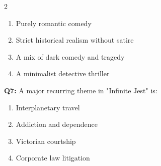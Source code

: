 \documentclass[10pt]{article}
\begin{document}
\begin{multicols}{2}
\begin{enumerate}[label=\arabic*.]
\item Purely romantic comedy
\item Strict historical realism without satire
\item A mix of dark comedy and tragedy
\item A minimalist detective thriller
\end{enumerate}
\textbf{Q7:} A major recurring theme in "Infinite Jest" is:

\begin{enumerate}[label=\arabic*.]
\item Interplanetary travel
\item Addiction and dependence
\item Victorian courtship
\item Corporate law litigation
\end{enumerate}
\end{multicols}

\newpage
\end{document}
